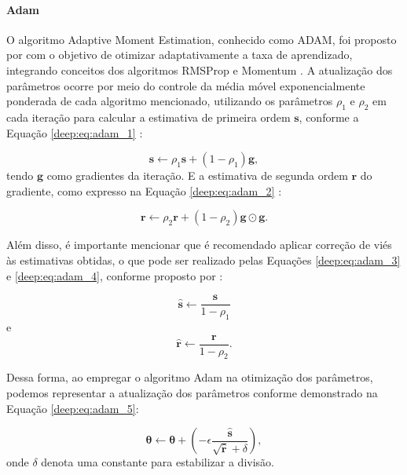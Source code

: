 \paragraph{Adam}
\label{deep:optimization:adam}

O algoritmo Adaptive Moment Estimation, conhecido como ADAM, foi proposto por \cite{Kingma2014Adam:Optimizationb} com o objetivo de otimizar adaptativamente a taxa de aprendizado, integrando conceitos dos algoritmos RMSProp \citep{Hinton2012NeuralDescent} e Momentum \citep{Polyak1964SomeMethods}. A atualização dos parâmetros ocorre por meio do controle da média móvel exponencialmente ponderada de cada algoritmo mencionado, utilizando os parâmetros $\rho_{1}$ e $\rho_{2}$ em cada iteração para calcular a estimativa de primeira ordem $\boldsymbol{s}$, conforme a Equação \ref{deep:eq:adam_1} \citep{Goodfellow2016}:

\begin{equation}
    \label{deep:eq:adam_1}
    \boldsymbol{s} \leftarrow \rho_{1} \boldsymbol{s} + (1 - \rho_{1})\boldsymbol{g},
\end{equation}
tendo $\boldsymbol{g}$ como gradientes da iteração. E a estimativa de segunda ordem $\boldsymbol{r}$ do gradiente, como expresso na Equação \ref{deep:eq:adam_2} \citep{Goodfellow2016}:

\begin{equation}
    \label{deep:eq:adam_2}
    \boldsymbol{r} \leftarrow \rho_{2} \boldsymbol{r} + (1 - \rho_{2})\boldsymbol{g} \odot \boldsymbol{g}.
\end{equation}

Além disso, é importante mencionar que é recomendado aplicar correção de viés às estimativas obtidas, o que pode ser realizado pelas Equações \ref{deep:eq:adam_3} e \ref{deep:eq:adam_4}, conforme proposto por \cite{Goodfellow2016}:

\begin{equation}
    \label{deep:eq:adam_3}
    \boldsymbol{\hat{s}} \leftarrow \frac{\boldsymbol{s}}{1-\rho_1}
\end{equation}
e
\begin{equation}
    \label{deep:eq:adam_4}
    \boldsymbol{\hat{r}} \leftarrow \frac{\boldsymbol{r}}{1-\rho_2}.
\end{equation}

Dessa forma, ao empregar o algoritmo Adam na otimização dos parâmetros, podemos representar a atualização dos parâmetros conforme demonstrado na Equação \ref{deep:eq:adam_5}:

\begin{equation}
    \label{deep:eq:adam_5}
    \boldsymbol{\theta} \leftarrow \boldsymbol{\theta} + \left(-\epsilon \frac{\boldsymbol{\hat{s}}}{\sqrt{\boldsymbol{\hat{r}}}+\delta}\right),
\end{equation}
onde $\delta$ denota uma constante para estabilizar a divisão.


